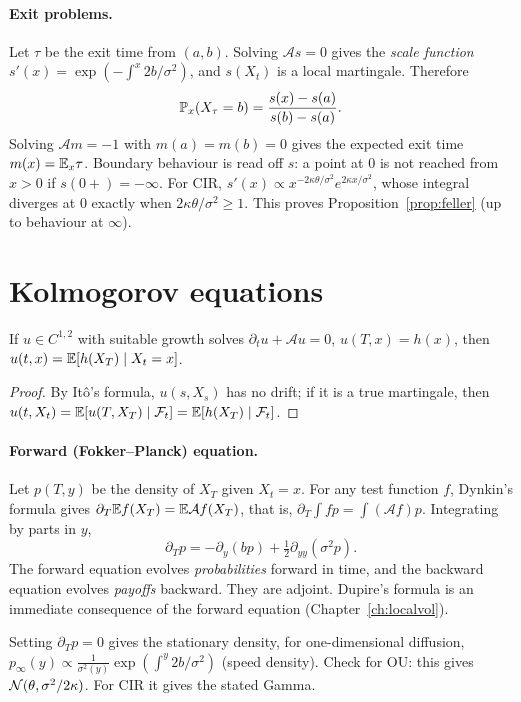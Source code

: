 \paragraph{Exit problems.} Let $\tau$ be the exit time from $(a,b)$. Solving $\mathcal{A}s=0$ gives the \emph{scale function} $s'(x)=\exp(-\int^x2b/\sigma^2)$, and $s(X_t)$ is a local martingale. Therefore
\[
\mathbb{P}_x(X_\tau=b)=\frac{s(x)-s(a)}{s(b)-s(a)}.
\]
Solving $\mathcal{A}m=-1$ with $m(a)=m(b)=0$ gives the expected exit time $m(x)=\mathbb{E}_x\tau$. Boundary behaviour is read off $s$: a point at $0$ is not reached from $x>0$ if $s(0+)=-\infty$. For CIR, $s'(x)\propto x^{-2\kappa\theta/\sigma^2}e^{2\kappa x/\sigma^2}$, whose integral diverges at $0$ exactly when $2\kappa\theta/\sigma^2\ge1$. This proves Proposition~\ref{prop:feller} (up to behaviour at $\infty$).

\section{Kolmogorov equations}

\begin{theorem}\label{thm:backward}
If $u\in C^{1,2}$ with suitable growth solves $\partial_tu+\mathcal{A}u=0$, $u(T,x)=h(x)$, then $u(t,x)=\mathbb{E}[h(X_T)\mid X_t=x]$.
\end{theorem}
\begin{proof}
By It\^o's formula, $u(s,X_s)$ has no drift; if it is a true martingale, then $u(t,X_t)=\mathbb{E}[u(T,X_T)\mid\mathcal{F}_t]=\mathbb{E}[h(X_T)\mid\mathcal{F}_t]$.
\end{proof}

\paragraph{Forward (Fokker--Planck) equation.} Let $p(T,y)$ be the density of $X_T$ given $X_t=x$. For any test function $f$, Dynkin's formula gives $\partial_T\mathbb{E} f(X_T)=\mathbb{E}\mathcal{A}f(X_T)$, that is, $\partial_T\int fp=\int(\mathcal{A}f)p$. Integrating by parts in $y$,
\begin{equation}\label{eq:fp}
\partial_Tp=-\partial_y(bp)+\tfrac12\partial_{yy}(\sigma^2p).
\end{equation}
The forward equation evolves \emph{probabilities} forward in time, and the backward equation evolves \emph{payoffs} backward. They are adjoint. Dupire's formula is an immediate consequence of the forward equation (Chapter~\ref{ch:localvol}).

Setting $\partial_T p=0$ gives the stationary density, for one-dimensional diffusion, $p_\infty(y)\propto\frac{1}{\sigma^2(y)}\exp(\int^y2b/\sigma^2)$ (speed density). Check for OU: this gives $\mathcal{N}(\theta,\sigma^2/2\kappa)$. For CIR it gives the stated Gamma.

